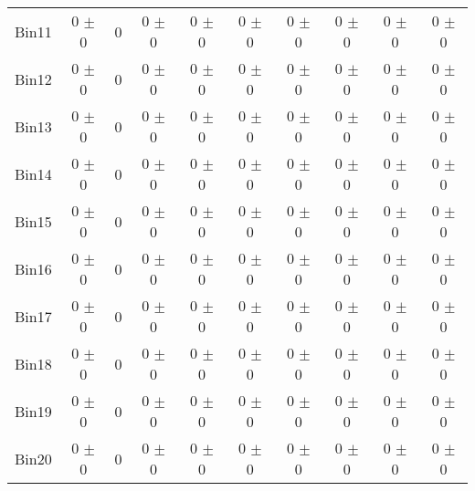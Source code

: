 \begin{tabular}{@{\extracolsep{4pt}}lccccccccc@{}}
     Bin11 & 0 $\pm$ 0 & 0 & 0 $\pm$ 0 & 0 $\pm$ 0 & 0 $\pm$ 0 & 0 $\pm$ 0 & 0 $\pm$ 0 & 0 $\pm$ 0 & 0 $\pm$ 0 \\ 
     Bin12 & 0 $\pm$ 0 & 0 & 0 $\pm$ 0 & 0 $\pm$ 0 & 0 $\pm$ 0 & 0 $\pm$ 0 & 0 $\pm$ 0 & 0 $\pm$ 0 & 0 $\pm$ 0 \\ 
     Bin13 & 0 $\pm$ 0 & 0 & 0 $\pm$ 0 & 0 $\pm$ 0 & 0 $\pm$ 0 & 0 $\pm$ 0 & 0 $\pm$ 0 & 0 $\pm$ 0 & 0 $\pm$ 0 \\ 
     Bin14 & 0 $\pm$ 0 & 0 & 0 $\pm$ 0 & 0 $\pm$ 0 & 0 $\pm$ 0 & 0 $\pm$ 0 & 0 $\pm$ 0 & 0 $\pm$ 0 & 0 $\pm$ 0 \\ 
     Bin15 & 0 $\pm$ 0 & 0 & 0 $\pm$ 0 & 0 $\pm$ 0 & 0 $\pm$ 0 & 0 $\pm$ 0 & 0 $\pm$ 0 & 0 $\pm$ 0 & 0 $\pm$ 0 \\ 
     Bin16 & 0 $\pm$ 0 & 0 & 0 $\pm$ 0 & 0 $\pm$ 0 & 0 $\pm$ 0 & 0 $\pm$ 0 & 0 $\pm$ 0 & 0 $\pm$ 0 & 0 $\pm$ 0 \\ 
     Bin17 & 0 $\pm$ 0 & 0 & 0 $\pm$ 0 & 0 $\pm$ 0 & 0 $\pm$ 0 & 0 $\pm$ 0 & 0 $\pm$ 0 & 0 $\pm$ 0 & 0 $\pm$ 0 \\ 
     Bin18 & 0 $\pm$ 0 & 0 & 0 $\pm$ 0 & 0 $\pm$ 0 & 0 $\pm$ 0 & 0 $\pm$ 0 & 0 $\pm$ 0 & 0 $\pm$ 0 & 0 $\pm$ 0 \\ 
     Bin19 & 0 $\pm$ 0 & 0 & 0 $\pm$ 0 & 0 $\pm$ 0 & 0 $\pm$ 0 & 0 $\pm$ 0 & 0 $\pm$ 0 & 0 $\pm$ 0 & 0 $\pm$ 0 \\ 
     Bin20 & 0 $\pm$ 0 & 0 & 0 $\pm$ 0 & 0 $\pm$ 0 & 0 $\pm$ 0 & 0 $\pm$ 0 & 0 $\pm$ 0 & 0 $\pm$ 0 & 0 $\pm$ 0 \\ 
\hline\hline
  \end{tabular}

